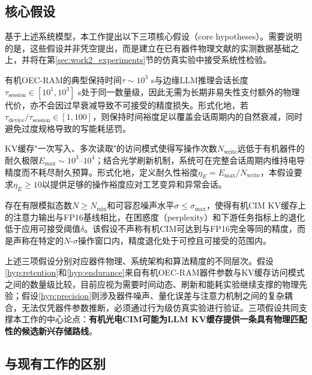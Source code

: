 \subsection{核心假设}

基于上述系统模型，本工作提出以下三项核心假设（core hypotheses）。需要说明的是，这些假设并非凭空提出，而是建立在已有器件物理文献的实测数据基础之上，并将在第\ref{sec:work2_experiments}节的仿真实验中接受系统性检验。

\begin{hypothesis}[保持时间匹配假设]
有机OEC-RAM的典型保持时间$\tau \sim 10^3$ s与边缘LLM推理会话长度$\tau_{\text{session}} \in [10^1, 10^3]$ s处于同一数量级，因此无需为长期非易失性支付额外的物理代价，亦不会因过早衰减导致不可接受的精度损失。形式化地，若$\tau_{\text{device}} / \tau_{\text{session}} \in [1, 100]$，则保持时间裕度足以覆盖会话周期内的自然衰减，同时避免过度规格导致的写能耗惩罚。
\label{hyp:retention}
\end{hypothesis}

\begin{hypothesis}[耐久性适配假设]
KV缓存"一次写入、多次读取"的访问模式使得写操作次数$N_{\text{write}}$远低于有机器件的耐久极限$E_{\text{max}} \sim 10^3$–$10^4$；结合光学刷新机制，系统可在完整会话周期内维持电导精度而不耗尽耐久预算。形式化地，定义耐久性裕度$\eta_E = E_{\text{max}} / N_{\text{write}}$，本假设要求$\eta_E \geq 10$以提供足够的操作裕度应对工艺变异和异常会话。
\label{hyp:endurance}
\end{hypothesis}

\begin{hypothesis}[模拟精度充分假设]
存在有限模拟态数$N \geq N_{\text{min}}$和可容忍噪声水平$\sigma \leq \sigma_{\text{max}}$，使得有机CIM KV缓存上的注意力输出与FP16基线相比，在困惑度（perplexity）和下游任务指标上的退化低于应用可接受阈值$\delta$。该假设不声称有机CIM可达到与FP16完全等同的精度，而是声称在特定的$N$-$\sigma$操作窗口内，精度退化处于可控且可接受的范围内。
\label{hyp:precision}
\end{hypothesis}

上述三项假设分别对应器件物理、系统架构和算法精度的不同层次。假设\ref{hyp:retention}和\ref{hyp:endurance}来自有机OEC-RAM器件参数与KV缓存访问模式之间的数量级比较，目前应视为需要时间动态、刷新和能耗实验继续支撑的物理先验；假设\ref{hyp:precision}则涉及器件噪声、量化误差与注意力机制之间的复杂耦合，无法仅凭器件参数推断，必须通过行为级仿真实验进行验证。三项假设共同支撑本工作的中心论点：\textbf{有机光电CIM可能为LLM KV缓存提供一条具有物理匹配性的候选新兴存储路线}。

\subsection{与现有工作的区别}

